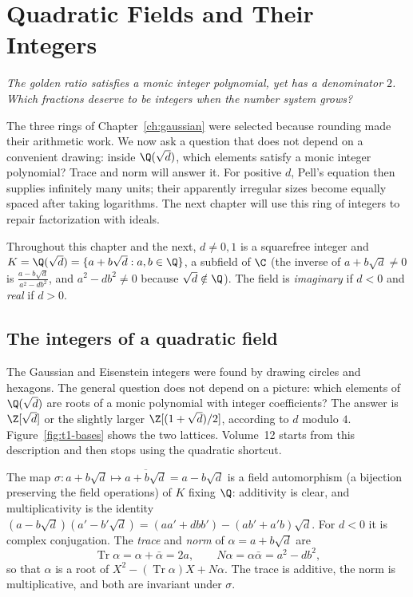 \chapter{Quadratic Fields and Their Integers}\label{ch:quadratic}

\begin{center}\itshape
The golden ratio satisfies a monic integer polynomial, yet has a denominator $2$.\\
Which fractions deserve to be integers when the number system grows?
\end{center}

The three rings of Chapter~\ref{ch:gaussian} were selected because rounding
made their arithmetic work. We now ask a question that does not depend on a
convenient drawing: inside $\Q(\sqrt d)$, which elements satisfy a monic
integer polynomial? Trace and norm will answer it. For positive $d$,
Pell's equation then supplies infinitely many units; their apparently
irregular sizes become equally spaced after taking logarithms.
The next chapter will use this ring of integers to repair factorization
with ideals.

Throughout this chapter and the next, $d\ne0,1$ is a squarefree integer and $K=\Q(\sqrt d)=\{a+b\sqrt d:a,b\in\Q\}$, a subfield of $\C$ (the inverse of $a+b\sqrt d\ne0$ is $\frac{a-b\sqrt d}{a^2-db^2}$, and $a^2-db^2\ne0$ because $\sqrt d\notin\Q$). The field is \emph{imaginary} if $d<0$ and \emph{real} if $d>0$.



\section{The integers of a quadratic field}

The Gaussian and Eisenstein integers were found by drawing circles and hexagons. The general question does not depend on a picture: which elements of $\Q(\sqrt d)$ are roots of a monic polynomial with integer coefficients? The answer is $\Z[\sqrt d]$ or the slightly larger $\Z[(1+\sqrt d)/2]$, according to $d$ modulo $4$. Figure~\ref{fig:t1-bases} shows the two lattices. Volume~12 starts from this description and then stops using the quadratic shortcut.

The map $\sigma:a+b\sqrt d\mapsto\overline{a+b\sqrt d}=a-b\sqrt d$ is a field automorphism (a bijection preserving the field operations) of $K$ fixing $\Q$: additivity is clear, and multiplicativity is the identity $(a-b\sqrt d)(a'-b'\sqrt d)=(aa'+dbb')-(ab'+a'b)\sqrt d$. For $d<0$ it is complex conjugation. The \emph{trace} and \emph{norm} of $\alpha=a+b\sqrt d$ are
\[
\operatorname{Tr}\alpha=\alpha+\bar\alpha=2a,\qquad N\alpha=\alpha\bar\alpha=a^2-db^2,
\]
so that $\alpha$ is a root of $X^2-(\operatorname{Tr}\alpha)X+N\alpha$. The trace is additive, the norm is multiplicative, and both are invariant under $\sigma$.

